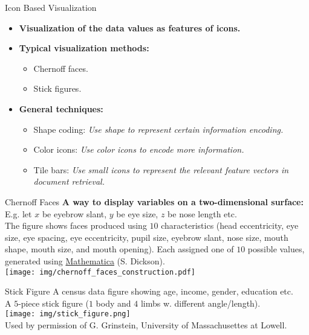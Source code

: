 \begin{frame}{Icon Based Visualization}
	\centering
	\begin{itemize}
		\item \textbf{Visualization of the data values as features of icons.}
		\item \textbf{Typical visualization methods:}
		      \begin{itemize}
			      \item Chernoff faces.
			      \item Stick figures.
		      \end{itemize}
		\item \textbf{General techniques:}
		      \begin{itemize}
			      \item Shape coding: \emph{Use shape to represent certain information encoding.}
			      \item Color icons: \emph{Use color icons to encode more information.}
			      \item Tile bars: \emph{Use small icons to represent the relevant feature vectors in document retrieval.}
		      \end{itemize}
	\end{itemize}
\end{frame}

\begin{frame}{Chernoff Faces}
	\textbf{A way to display variables on a two-dimensional surface:}\\
	E.g. let $x$ be eyebrow slant, $y$ be eye size, $z$ be nose length etc.\\
	The figure shows faces produced using $10$ characteristics (head eccentricity, eye size, eye spacing, eye eccentricity, pupil size, eyebrow slant, nose size, mouth shape, mouth size, and mouth opening). Each assigned one of $10$ possible values, generated using \href{https://www.wolfram.com/mathematica/}{Mathematica} (S. Dickson).\\[0.5cm]
	\centering
	\texttt{[image: img/chernoff\_faces\_construction.pdf]}
\end{frame}

\begin{frame}{Stick Figure}
	A census data figure showing age, income, gender, education etc. \\
	A $5$-piece stick figure ($1$ body and $4$ limbs w. different angle/length).\\[0.1cm]
	\centering
	\texttt{[image: img/stick\_figure.png]}\\
	\tiny{Used by permission of G. Grinstein, University of Massachusettes at Lowell.}
\end{frame}

